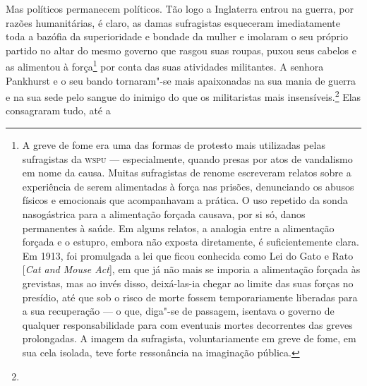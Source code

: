 Mas políticos permanecem políticos. Tão logo a Inglaterra entrou na
guerra, por razões humanitárias, é claro, as damas sufragistas
esqueceram imediatamente toda a bazófia da superioridade e bondade da
mulher e imolaram o seu próprio partido no altar do mesmo governo que
rasgou suas roupas, puxou seus cabelos e as alimentou à força\footnote{A
  greve de fome era uma das formas de protesto mais utilizadas pelas
  sufragistas da \textsc{wspu} --- especialmente, quando presas por atos de vandalismo
  em nome da causa. Muitas
  sufragistas de renome escreveram relatos sobre a experiência de serem
  alimentadas à força nas prisões, denunciando os abusos físicos e
  emocionais que acompanhavam a prática. O uso repetido da sonda
  nasogástrica para a alimentação forçada causava, por si só, danos
  permanentes à saúde. Em alguns relatos, a analogia entre a alimentação
  forçada e o estupro, embora não exposta diretamente, é suficientemente
  clara. Em 1913, foi promulgada a lei que ficou conhecida como Lei do
  Gato e Rato {[}\textit{Cat and Mouse Act}{]}, em que já não mais se
  imporia a alimentação forçada às grevistas, mas ao invés disso,
  deixá-las-ia chegar ao limite das suas forças no presídio, até que sob o
  risco de morte fossem temporariamente liberadas para a sua
  recuperação --- o que, diga"-se de passagem, isentava o governo de
  qualquer responsabilidade para com eventuais mortes decorrentes das
  greves prolongadas. A imagem da sufragista, voluntariamente em greve
  de fome, em sua cela isolada, teve forte ressonância na imaginação
  pública.} por conta das suas atividades militantes. A senhora
Pankhurst e o seu bando tornaram"-se mais apaixonadas na sua mania de
guerra e na sua sede pelo sangue do inimigo do que os militaristas mais
insensíveis.\footnote{} Elas consagraram tudo, até a
